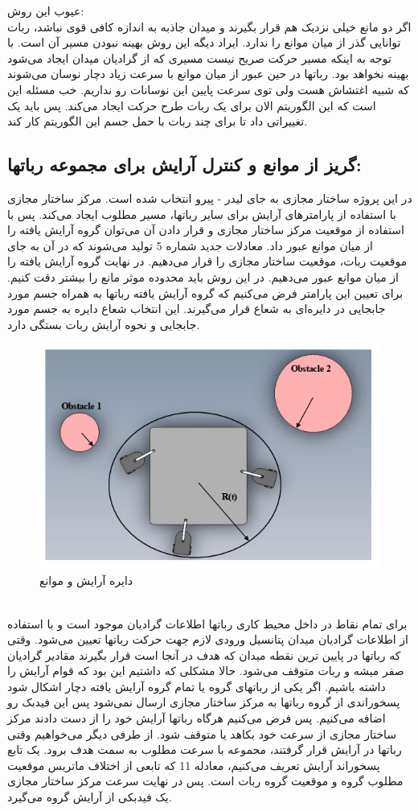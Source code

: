 عیوب این روش:
\\
اگر دو مانع خیلی نزدیک هم قرار بگیرند و میدان جاذبه به اندازه کافی قوی نباشد، ربات توانایی گذر از میان موانع را ندارد.
ایراد دیگه این روش بهینه نبودن مسیر آن است. با توجه به اینکه مسیر حرکت صریح نیست مسیری که از گرادیان میدان ایجاد می‌شود بهینه نخواهد بود.
رباتها در حین عبور از میان موانع با سرعت زیاد دچار نوسان می‌شوند که شبیه اغتشاش هست ولی توی سرعت پایین این نوسانات رو نداریم.
خب مسئله این است که این الگوریتم الان برای یک ربات طرح حرکت ایجاد می‌کند. پس باید یک تغییراتی داد تا برای چند ربات با حمل جسم این الگوریتم کار کند.

\subsection{گریز از موانع و کنترل آرایش برای مجموعه رباتها:}
در این پروژه ساختار مجازی به جای لیدر - پیرو انتخاب شده است. مرکز ساختار مجازی با استفاده از پارامترهای آرایش برای سایر رباتها، مسیر مطلوب ایجاد می‌کند. پس با استفاده از موقعیت مرکز ساختار مجازی و قرار دادن آن می‌توان گروه آرایش یافته را از میان موانع عبور داد.
معادلات جدید شماره 5 تولید می‌شوند که در آن به جای موقعیت ربات، موقعیت ساختار مجازی را قرار می‌دهیم. در نهایت گروه آرایش یافته را از میان موانع عبور می‌دهیم.
در این روش باید محدوده موثر مانع را بیشتر دقت کنیم. برای تعیین این پارامتر فرض می‌کنیم که گروه آرایش یافته رباتها به همراه جسم مورد جابجایی در دایره‌ای به شعاع 
قرار می‌گیرند. این انتخاب شعاع دایره به جسم مورد جابجایی و نحوه آرایش ربات بستگی دارد.

\begin{figure}[h]
	\centering
	\includegraphics[width=0.7\linewidth]{images/9}
	\caption{دایره آرایش و موانع}
	\label{fig:9}
\end{figure}
\noindent\unskip
\\
برای تمام نقاط در داخل محیط کاری رباتها اطلاعات گرادیان موجود است و با استفاده از اطلاعات گرادیان میدان پتانسیل ورودی لازم جهت حرکت رباتها تعیین می‌شود. وقتی که رباتها در پایین ترین نقطه میدان که هدف در آنجا است قرار بگیرند مقادیر گرادیان صفر میشه و ربات متوقف می‌شود.
حالا مشکلی که داشتیم این بود که قوام آرایش را داشته باشیم. اگر یکی از  رباتهای گروه یا تمام گروه آرایش یافته دچار اشکال شود پسخوراندی از گروه رباتها به مرکز ساختار مجازی ارسال نمی‌شود پس این فیدبک رو اضافه می‌کنیم. پس فرض می‌کنیم هرگاه رباتها آرایش خود را از دست دادند مرکز ساختار مجازی از سرعت خود بکاهد یا متوقف شود. از طرفی دیگر می‌خواهیم وقتی رباتها در آرایش قرار گرفتند، محموعه با سرعت مطلوب به سمت هدف برود.
یک تابع پسخوراند آرایش تعریف می‌کنیم، معادله 11 که تابعی از اختلاف ماتریس موقعیت مطلوب گروه و موقعیت گروه ربات است. پس در نهایت سرعت مرکز ساختار مجازی  یک فیدبکی از آرایش گروه می‌گیرد.

